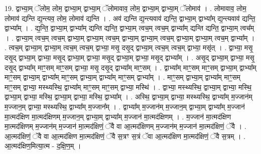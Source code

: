 \documentclass[17pt]{extarticle}
\begin{document}
19. द्वाभ्या॒म् ॅलोम॒ लोम॒ द्वाभ्या॒म् द्वाभ्या॒म् ॅलोमावाव॒ लोम॒ द्वाभ्या॒म् द्वाभ्या॒म् ॅलोमाव॑ । . लोमावाव॒ लोम॒ लोमाव॑ द्यन्ति द्य॒न्त्यव॒ लोम॒ लोमाव॑ द्यन्ति । . अव॑ द्यन्ति द्य॒न्त्यवाव॑ द्यन्ति॒ द्वाभ्या॒म् द्वाभ्या᳚म् द्य॒न्त्यवाव॑ द्यन्ति॒ द्वाभ्या᳚म् । . द्य॒न्ति॒ द्वाभ्या॒म् द्वाभ्या᳚म् द्यन्ति द्यन्ति॒ द्वाभ्या॒म् त्वच॒म् त्वच॒म् द्वाभ्या᳚म् द्यन्ति द्यन्ति॒ द्वाभ्या॒म् त्वच᳚म् । . द्वाभ्या॒म् त्वच॒म् त्वच॒म् द्वाभ्या॒म् द्वाभ्या॒म् त्वच॒म् द्वाभ्या॒म् द्वाभ्या॒म् त्वच॒म् द्वाभ्या॒म् द्वाभ्या॒म् त्वच॒म् द्वाभ्या᳚म् । . त्वच॒म् द्वाभ्या॒म् द्वाभ्या॒म् त्वच॒म् त्वच॒म् द्वाभ्या॒ मसृ॒ दसृ॒द् द्वाभ्या॒म् त्वच॒म् त्वच॒म् द्वाभ्या॒ मसृ॑त् । . द्वाभ्या॒ मसृ॒ दसृ॒द् द्वाभ्या॒म् द्वाभ्या॒ मसृ॒द् द्वाभ्या॒म् द्वाभ्या॒ मसृ॒द् द्वाभ्या॒म् द्वाभ्या॒ मसृ॒द् द्वाभ्या᳚म् । . असृ॒द् द्वाभ्या॒म् द्वाभ्या॒ मसृ॒ दसृ॒द् द्वाभ्या᳚म् माꣳ॒॒सम् माꣳ॒॒सम् द्वाभ्या॒ मसृ॒ दसृ॒द् द्वाभ्या᳚म् माꣳ॒॒सम् । . द्वाभ्या᳚म् माꣳ॒॒सम् माꣳ॒॒सम् द्वाभ्या॒म् द्वाभ्या᳚म् माꣳ॒॒सम् द्वाभ्या॒म् द्वाभ्या᳚म् माꣳ॒॒सम् द्वाभ्या॒म् द्वाभ्या᳚म् माꣳ॒॒सम् द्वाभ्या᳚म् । . माꣳ॒॒सम् द्वाभ्या॒म् द्वाभ्या᳚म् माꣳ॒॒सम् माꣳ॒॒सम् द्वाभ्या॒ मस्थ्यस्थि॒ द्वाभ्या᳚म् माꣳ॒॒सम् माꣳ॒॒सम् द्वाभ्या॒ मस्थि॑ । . द्वाभ्या॒ मस्थ्यस्थि॒ द्वाभ्या॒म् द्वाभ्या॒ मस्थि॒ द्वाभ्या॒म् द्वाभ्या॒ मस्थि॒ द्वाभ्या॒म् द्वाभ्या॒ मस्थि॒ द्वाभ्या᳚म् । . अस्थि॒ द्वाभ्या॒म् द्वाभ्या॒ मस्थ्यस्थि॒ द्वाभ्या᳚म् म॒ज्जान॑म् म॒ज्जान॒म् द्वाभ्या॒ मस्थ्यस्थि॒ द्वाभ्या᳚म् म॒ज्जान᳚म् । . द्वाभ्या᳚म् म॒ज्जान॑म् म॒ज्जान॒म् द्वाभ्या॒म् द्वाभ्या᳚म् म॒ज्जान॑ मा॒त्मद॑क्षिण मा॒त्मद॑क्षिणम् म॒ज्जान॒म् द्वाभ्या॒म् द्वाभ्या᳚म् म॒ज्जान॑ मा॒त्मद॑क्षिणम् । . म॒ज्जान॑ मा॒त्मद॑क्षिण मा॒त्मद॑क्षिणम् म॒ज्जान॑म् म॒ज्जान॑ मा॒त्मद॑क्षिणं॒ ॅवै वा आ॒त्मद॑क्षिणम् म॒ज्जान॑म् म॒ज्जान॑ मा॒त्मद॑क्षिणं॒ ॅवै । . आ॒त्मद॑क्षिणं॒ ॅवै वा आ॒त्मद॑क्षिण मा॒त्मद॑क्षिणं॒ ॅवै स॒त्रꣳ स॒त्रं ॅवा आ॒त्मद॑क्षिण मा॒त्मद॑क्षिणं॒ ॅवै स॒त्रम् । . आ॒त्मद॑क्षिण॒मित्या॒त्म - द॒क्षि॒ण॒म् । \newline
\end{document}
